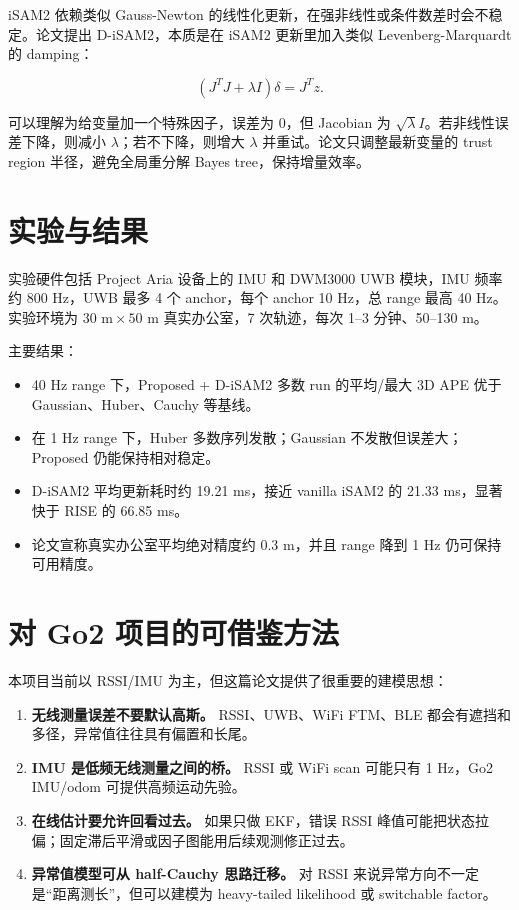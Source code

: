 \documentclass[UTF8,a4paper,12pt]{ctexrep}
\begin{document}
iSAM2 依赖类似 Gauss-Newton 的线性化更新，在强非线性或条件数差时会不稳定。论文提出 D-iSAM2，本质是在 iSAM2 更新里加入类似 Levenberg-Marquardt 的 damping：

\[
(J^TJ+\lambda I)\delta=J^Tz.
\]

可以理解为给变量加一个特殊因子，误差为 0，但 Jacobian 为 \(\sqrt{\lambda}I\)。若非线性误差下降，则减小 \(\lambda\)；若不下降，则增大 \(\lambda\) 并重试。论文只调整最新变量的 trust region 半径，避免全局重分解 Bayes tree，保持增量效率。

\section{实验与结果}

实验硬件包括 Project Aria 设备上的 IMU 和 DWM3000 UWB 模块，IMU 频率约 800 Hz，UWB 最多 4 个 anchor，每个 anchor 10 Hz，总 range 最高 40 Hz。实验环境为 \(30\text{ m}\times50\text{ m}\) 真实办公室，7 次轨迹，每次 1--3 分钟、50--130 m。

主要结果：

\begin{itemize}
  \item 40 Hz range 下，Proposed + D-iSAM2 多数 run 的平均/最大 3D APE 优于 Gaussian、Huber、Cauchy 等基线。
  \item 在 1 Hz range 下，Huber 多数序列发散；Gaussian 不发散但误差大；Proposed 仍能保持相对稳定。
  \item D-iSAM2 平均更新耗时约 19.21 ms，接近 vanilla iSAM2 的 21.33 ms，显著快于 RISE 的 66.85 ms。
  \item 论文宣称真实办公室平均绝对精度约 0.3 m，并且 range 降到 1 Hz 仍可保持可用精度。
\end{itemize}

\section{对 Go2 项目的可借鉴方法}

本项目当前以 RSSI/IMU 为主，但这篇论文提供了很重要的建模思想：

\begin{enumerate}
  \item \textbf{无线测量误差不要默认高斯。} RSSI、UWB、WiFi FTM、BLE 都会有遮挡和多径，异常值往往具有偏置和长尾。
  \item \textbf{IMU 是低频无线测量之间的桥。} RSSI 或 WiFi scan 可能只有 1 Hz，Go2 IMU/odom 可提供高频运动先验。
  \item \textbf{在线估计要允许回看过去。} 如果只做 EKF，错误 RSSI 峰值可能把状态拉偏；固定滞后平滑或因子图能用后续观测修正过去。
  \item \textbf{异常值模型可从 half-Cauchy 思路迁移。} 对 RSSI 来说异常方向不一定是“距离测长”，但可以建模为 heavy-tailed likelihood 或 switchable factor。
\end{enumerate}
\end{document}
